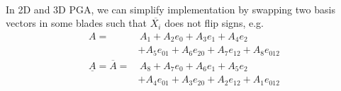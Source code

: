 \documentclass[twoside]{article}
\begin{document}
\begin{multicols*}{2}
\begin{gather*}
                \end{gather*}
            \par
                In 2D and 3D PGA, we can simplify implementation
                by swapping two basis vectors in some blades such that
                $ \overline{X_i} $ does not flip signs, e.g.
                $$\begin{aligned}
                    A = & \, A_1 + A_2 e_0 + A_3 e_1 + A_4 e_2 \\
                    &+ A_5 e_{01} + A_6 e_{20} + A_7 e_{12} + A_8 e_{012} \\
                    \underline{A} = \overline{A} = & \, A_8 + A_7 e_0 + A_6 e_1 + A_5 e_2 \\
                    &+ A_4 e_{01} + A_3 e_{20} + A_2 e_{12} + A_1 e_{012} \\
                \end{aligned}$$

\end{multicols*}
\end{document}
